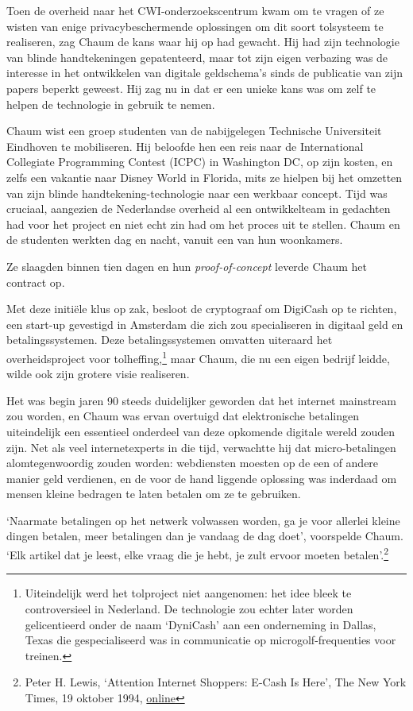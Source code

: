 \documentclass[smalldemyvopaper,11pt,twoside,onecolumn,openright,extrafontsizes,hidelinks]{memoir}
\begin{document}
Toen de overheid naar het CWI-onderzoekscentrum kwam om te vragen of ze
wisten van enige privacybeschermende oplossingen om dit soort tolsysteem
te realiseren, zag Chaum de kans waar hij op had gewacht. Hij had zijn
technologie van blinde handtekeningen gepatenteerd, maar tot zijn eigen
verbazing was de interesse in het ontwikkelen van digitale geldschema's
sinds de publicatie van zijn papers beperkt geweest. Hij zag nu in dat
er een unieke kans was om zelf te helpen de technologie in gebruik te
nemen.

Chaum wist een groep studenten van de nabijgelegen Technische
Universiteit Eindhoven te mobiliseren. Hij beloofde hen een reis naar de
International Collegiate Programming Contest (ICPC) in Washington DC, op
zijn kosten, en zelfs een vakantie naar Disney World in Florida, mits ze
hielpen bij het omzetten van zijn blinde handtekening-technologie naar
een werkbaar concept. Tijd was cruciaal, aangezien de Nederlandse
overheid al een ontwikkelteam in gedachten had voor het project en niet
echt zin had om het proces uit te stellen. Chaum en de studenten werkten
dag en nacht, vanuit een van hun woonkamers.

Ze slaagden binnen tien dagen en hun \emph{proof-of-concept} leverde
Chaum het contract op.

Met deze initiële klus op zak, besloot de cryptograaf om DigiCash op te
richten, een start-up gevestigd in Amsterdam die zich zou specialiseren
in digitaal geld en betalingssystemen. Deze betalingssystemen omvatten
uiteraard het overheidsproject voor tolheffing,\footnote{Uiteindelijk
  werd het tolproject niet aangenomen: het idee bleek te controversieel
  in Nederland. De technologie zou echter later worden gelicentieerd
  onder de naam `DyniCash' aan een onderneming in Dallas, Texas die
  gespecialiseerd was in communicatie op microgolf-frequenties voor
  treinen.} maar Chaum, die nu een eigen bedrijf leidde, wilde ook zijn
grotere visie realiseren.

Het was begin jaren 90 steeds duidelijker geworden dat het internet
mainstream zou worden, en Chaum was ervan overtuigd dat elektronische
betalingen uiteindelijk een essentieel onderdeel van deze opkomende
digitale wereld zouden zijn. Net als veel internetexperts in die tijd,
verwachtte hij dat micro-betalingen alomtegenwoordig zouden worden:
webdiensten moesten op de een of andere manier geld verdienen, en de
voor de hand liggende oplossing was inderdaad om mensen kleine bedragen
te laten betalen om ze te gebruiken.

`Naarmate betalingen op het netwerk volwassen worden, ga je voor
allerlei kleine dingen betalen, meer betalingen dan je vandaag de dag
doet', voorspelde Chaum. `Elk artikel dat je leest, elke vraag die je
hebt, je zult ervoor moeten betalen'.\footnote{Peter H. Lewis,
  `Attention Internet Shoppers: E-Cash Is Here', The New York Times, 19
  oktober 1994,
  \href{https://www.nytimes.com/1994/10/19/business/attention-internet-shoppers-e-cash-is-here.html}{online}}
\end{document}
